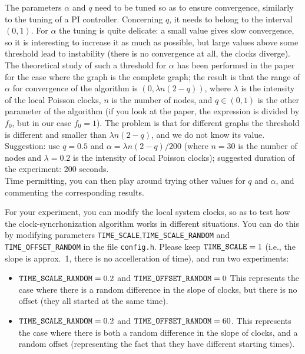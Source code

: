 \documentclass{article}
\begin{document}
The parameters $\alpha$ and $q$ need to be tuned so as to ensure convergence, similarly to the tuning of a PI controller.
Concerning $q$, it needs to belong to the interval $(0,1)$. For $\alpha$ the tuning is quite delicate: a small value gives slow convergence, so it is interesting to increase it as much as possible, but large values above some threshold lead to instability (there is no convergence at all, the clocks diverge). The theoretical study of such a threshold for $\alpha$ has been performed in the paper \cite{RandSync-journal} for the case where the graph is the complete graph; the result is that the range of $\alpha$ for convergence of the algorithm is $(0, \lambda n (2-q))$, where $\lambda$ is the intensity of the local Poisson clocks, $n$ is the number of nodes, and $q \in (0,1) $ is the other parameter of the algorithm (if you look at the paper, the expression is divided by $f_0$, but in our case $f_0=1$). The problem is that for different graphs the threshold is different and smaller than $\lambda n (2-q)$, and we do not know its value. \\
Suggestion: use $q=0.5$ and $\alpha = \lambda n (2-q)/200$ (where $n=30$ is the number of nodes and $\lambda = 0.2$ is the intensity of local Poisson clocks); suggested duration of the experiment: 200 seconds.\\ Time permitting, you can then play around trying other values for $q$ and $\alpha$, and commenting the corresponding results.


For your experiment, you can modify the local system clocks, so as to test how the clock-syncrhonization algorithm works in different situations. You can do this by modifying parameters \verb=TIME_SCALE=,\verb=TIME_SCALE_RANDOM= and \verb=TIME_OFFSET_RANDOM= in the file \verb=config.h=. Please keep $\verb=TIME_SCALE= = 1$ (i.e., the slope is approx.~1, there is no accelleration of time), and run two experiments:
\begin{itemize}
\item
$\verb=TIME_SCALE_RANDOM= =0.2 $ and $ \verb=TIME_OFFSET_RANDOM= = 0$
This represents the case where there is a random difference in the slope of clocks, but there is no offset (they all started at the same time).
\item
$\verb=TIME_SCALE_RANDOM= =0.2 $ and $ \verb=TIME_OFFSET_RANDOM= = 60$.
This represents the case where there is both a random difference in the slope of clocks, and a random offset (representing the fact that they have different starting times).
\end{itemize}
\end{document}
